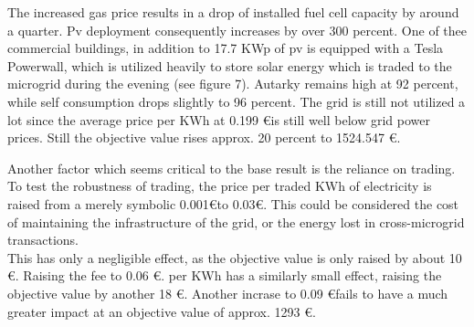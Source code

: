 \documentclass[
	11pt,								%
	DIV10,								%
	a4paper,         					%
	oneside,							%
	headheight=20pt,					%
	footheight=20pt,					%
    parskip=full,						%
    listof=totoc,						%
	bibliography=totoc,					%
	index=totoc,						%
]{scrartcl}
\begin{document}
The increased gas price results in a drop of installed fuel cell capacity by around a quarter. Pv deployment consequently increases by over 300 percent. One of thee commercial buildings, in addition to 17.7 KWp of pv is equipped with a Tesla Powerwall, which is utilized heavily to store solar energy which is traded to the microgrid during the evening (see figure 7). Autarky remains high at 92 percent, while self consumption drops slightly to 96 percent. The grid is still not utilized a lot since the average price per KWh at 0.199 \euro is still well below grid power prices. Still the objective value rises approx. 20 percent to 1524.547 \euro.

Another factor which seems critical to the base result is the reliance on trading. To test the robustness of trading, the price per traded KWh of electricity is raised from a merely symbolic 0.001\euro to 0.03\euro. This could be considered the cost of maintaining the infrastructure of the grid, or the energy lost in cross-microgrid transactions.
\\
This has only a negligible effect, as the objective value is only raised by about 10 \euro. Raising the fee to 0.06 \euro. per KWh has a similarly small effect, raising the objective value by another 18 \euro. Another incrase to 0.09 \euro fails to have a much greater impact at an objective value of approx. 1293 \euro. 
\end{document}
